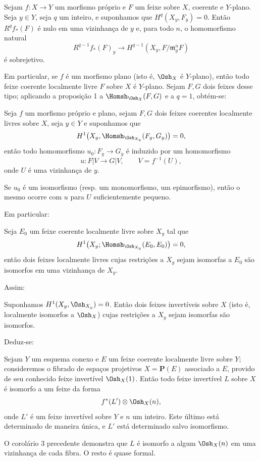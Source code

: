  Sejam $f:X\longrightarrow Y$ um morfismo próprio e $F$
um feixe sobre $X$, coerente e $Y$-plano. Seja $y\in Y$, seja $q$ um inteiro, e
suponhamos que $H^q(X_y,F_y)=0$. Então $R^qf_*(F)$ é nulo em uma vizinhança de
$y$ e, para todo $n$, o homomorfismo natural
\[
  R^{q-1}f_*(F)_y\longrightarrow
  H^{q-1}(X_y,F/\mathfrak m_y^nF)
\]
é sobrejetivo.

Em particular, se $f$ é um morfismo plano (isto é, $\Osh_X$ é $Y$-plano),
então todo feixe coerente localmente livre $F$ sobre $X$ é $Y$-plano. Sejam
$F,G$ dois feixes desse tipo; aplicando a proposição 1 a
$\Homsh_{\Osh_X}(F,G)$ e a $q=1$, obtém-se:

 Seja $f$ um morfismo próprio e plano, sejam $F,G$ dois feixes
coerentes localmente livres sobre $X$, seja $y\in Y$ e suponhamos que
\[
  H^1\bigl(X_y,\Homsh_{\Osh_{X_y}}(F_y,G_y)\bigr)=0,
\]
então todo homomorfismo $u_0:F_y\longrightarrow G_y$ é induzido por um
homomorfismo
\[
  u:F|V\longrightarrow G|V,
  \qquad V=f^{-1}(U),
\]
onde $U$ é uma vizinhança de $y$.

 Se $u_0$ é um isomorfismo (resp. um monomorfismo, um
epimorfismo), então o mesmo ocorre com $u$ para $U$ suficientemente
pequeno.

Em particular:

 Seja $E_0$ um feixe coerente localmente livre sobre $X_y$
tal que
\[
  H^1\bigl(X_y;\Homsh_{\Osh_{X_y}}(E_0,E_0)\bigr)=0,
\]
então dois feixes localmente livres cujas restrições a $X_y$ sejam isomorfas
a $E_0$ são isomorfos em uma vizinhança de $X_y$.

Assim:

 Suponhamos $H^1(X_y,\Osh_{X_y})=0$. Então dois feixes
invertíveis sobre $X$ (isto é, localmente isomorfos a $\Osh_X$) cujas
restrições a $X_y$ sejam isomorfas são isomorfos.

Deduz-se:

 Sejam $Y$ um esquema conexo e $E$ um feixe coerente
localmente livre sobre $Y$; consideremos o fibrado de espaços projetivos
$X=\mathbf P(E)$ associado a $E$, provido de seu conhecido feixe invertível
$\Osh_X(1)$. Então todo feixe invertível $L$ sobre $X$ é isomorfo a um feixe da
forma
\[
  f^*(L')\otimes\Osh_X(n),
\]
onde $L'$ é um feixe invertível sobre $Y$ e $n$ um inteiro. Este último está
determinado de maneira única, e $L'$ está determinado salvo isomorfismo.

O corolário 3 precedente demonstra que $L$ é isomorfo a algum $\Osh_X(n)$ em
uma vizinhança de cada fibra. O resto é quase formal.

